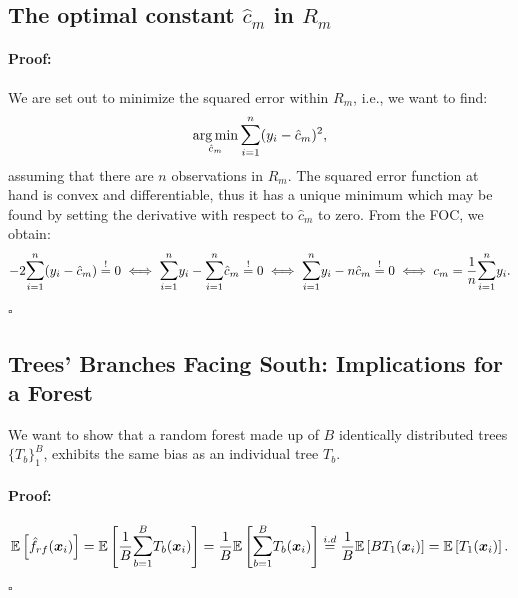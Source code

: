 \documentclass[a4paper,12pt, headsepline]{scrartcl}
\DeclareMathOperator*{\argminA}{arg\,min}
\newenvironment{proof}{\paragraph{Proof:}}{\hfill$\square$}
\numberwithin{equation}{section}
\begin{document}
 \subsection{The optimal constant $\hat c_m$ in $R_m$}\label{App:A2}
  \begin{proof}
 We are set out to minimize the squared error within $R_m$, i.e., we want to find:
 \[
 \argminA_{\hat c_m} \mathlarger{\sum}\limits_{i = 1}^{n}(y_i - \hat c_m)^2,
 \]
 assuming that there are $n$ observations in $R_m$. The squared error function at hand is convex and differentiable, thus it has a unique minimum which may be found by setting the derivative with respect to $\hat c_m$ to zero. From the FOC, we obtain:
\begin{gather*}
	  -2\mathlarger{\sum}\limits_{i = 1}^{n}(y_i - \hat c_m) \overset{!}{=} 0 
	 \iff \mathlarger{\sum}\limits_{i = 1}^{n} y_i - \mathlarger{\sum}\limits_{i = 1}^{n} \hat c_m \overset{!}{=} 0
	 \iff \mathlarger{\sum}\limits_{i = 1}^{n} y_i - n \hat c_m \overset{!}{=} 0
	 \iff c_m = \frac{1}{n} \mathlarger{\sum}\limits_{i = 1}^{n} y_i.
\end{gather*}
\end{proof}

 
 \subsection{Trees' Branches Facing South: Implications for a Forest}\label{App:A3} 
 We want to show that a random forest made up of $B$ identically distributed trees $\{T_b\}_1^B$, exhibits the same bias as an individual tree $T_b$.
 \begin{proof}
 	\[
 		\mathbb{E}\left[ \hat f_{rf}(\bm x_i)\right] =\mathbb{E}\left[ \frac{1}{B} \mathlarger{\sum}\limits_{b = 1}^B T_b(\bm x_i)\right] = \frac{1}{B}\mathbb{E}\left[\mathlarger{\sum}\limits_{b = 1}^B T_b(\bm x_i)\right]\overset{i.d}{=} \frac{1}{B}\mathbb{E}\left[BT_1(\bm x_i)\right] = \mathbb{E}\left[T_1(\bm x_i)\right].
 	\]
 \end{proof}
\end{document}
